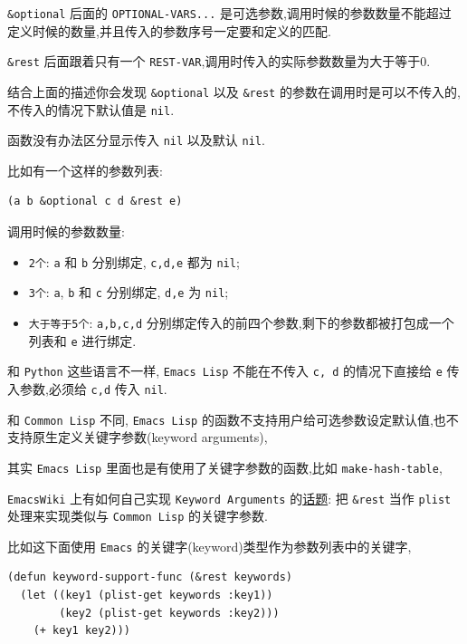 \documentclass[11pt]{article}
\begin{document}
\begin{enumerate}
\texttt{\&optional} 后面的 \texttt{OPTIONAL-VARS...} 是可选参数,调用时候的参数数量不能超过定义时候的数量,并且传入的参数序号一定要和定义的匹配.

\texttt{\&rest} 后面跟着只有一个 \texttt{REST-VAR},调用时传入的实际参数数量为大于等于0.

结合上面的描述你会发现 \texttt{\&optional} 以及 \texttt{\&rest} 的参数在调用时是可以不传入的,不传入的情况下默认值是 \texttt{nil}.

函数没有办法区分显示传入 \texttt{nil} 以及默认 \texttt{nil}.

比如有一个这样的参数列表:

\begin{verbatim}
(a b &optional c d &rest e)
\end{verbatim}

调用时候的参数数量:

\begin{itemize}
\item \texttt{2个}: \texttt{a} 和 \texttt{b} 分别绑定, \texttt{c,d,e} 都为 \texttt{nil};

\item \texttt{3个}: \texttt{a}, \texttt{b} 和 \texttt{c} 分别绑定, \texttt{d,e} 为 \texttt{nil};

\item \texttt{大于等于5个}: \texttt{a,b,c,d} 分别绑定传入的前四个参数,剩下的参数都被打包成一个列表和 \texttt{e} 进行绑定.
\end{itemize}

和 \texttt{Python} 这些语言不一样, \texttt{Emacs Lisp} 不能在不传入 \texttt{c, d} 的情况下直接给 \texttt{e} 传入参数,必须给 \texttt{c,d} 传入 \texttt{nil}.

和 \texttt{Common Lisp} 不同, \texttt{Emacs Lisp} 的函数不支持用户给可选参数设定默认值,也不支持原生定义关键字参数(keyword arguments),

其实 \texttt{Emacs Lisp} 里面也是有使用了关键字参数的函数,比如 \texttt{make-hash-table},

\texttt{EmacsWiki} 上有如何自己实现 \texttt{Keyword Arguments} 的\href{https://emacswiki.org/emacs/KeywordArguments}{话题}: 把 \texttt{\&rest} 当作 \texttt{plist} 处理来实现类似与 \texttt{Common Lisp} 的关键字参数.

比如这下面使用 \texttt{Emacs} 的关键字(keyword)类型作为参数列表中的关键字,

\begin{verbatim}
(defun keyword-support-func (&rest keywords)
  (let ((key1 (plist-get keywords :key1))
        (key2 (plist-get keywords :key2)))
    (+ key1 key2)))


\end{verbatim}
\end{enumerate}
\end{document}
